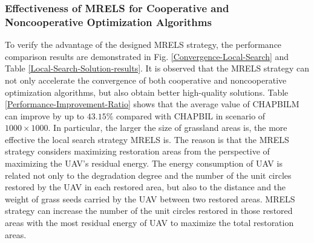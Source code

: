 \documentclass[preprint,5pt]{elsarticle}
\begin{document}
\subsubsection{Effectiveness of MRELS for Cooperative and Noncooperative Optimization Algorithms}
To verify the advantage of the designed MRELS strategy, the performance comparison results are demonstrated in Fig. \ref{Convergence-Local-Search} and Table \ref{Local-Search-Solution-results}. It is observed that the MRELS strategy can not only accelerate the convergence of both cooperative and noncooperative optimization algorithms, but also obtain better high-quality solutions. Table \ref{Performance-Improvement-Ratio} shows that the average value of CHAPBILM can improve by up to $43.15\%$ compared with CHAPBIL in scenario of $1000 \times 1000$. In particular, the larger the size of grassland areas is, the more effective the local search strategy MRELS is. The reason is that the MRELS strategy considers maximizing restoration areas from the perspective of maximizing the UAV's residual energy. The energy consumption of UAV is related not only to the degradation degree and the number of the unit circles restored by the UAV in each restored area, but also to the distance and the weight of grass seeds carried by the UAV between two restored areas. MRELS strategy can increase the number of the unit circles restored in those restored areas with the most residual energy of UAV to maximize the total restoration areas.
\end{document}
